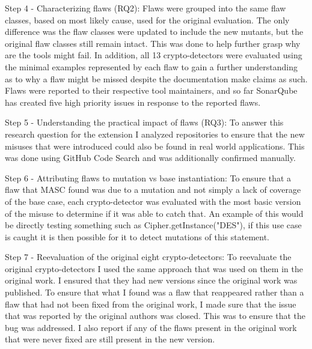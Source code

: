 Step 4 - Characterizing flaws (RQ2): Flaws were grouped into the same flaw classes, based on most likely cause, used for the original evaluation. The only difference was the flaw classes were updated to include the new mutants, but the original flaw classes still remain intact. This was done to help further grasp why are the tools might fail. In addition, all 13 crypto-detectors were evaluated using the minimal examples represented by each flaw to gain a further understanding as to why a flaw might be missed despite the documentation make claims as such. Flaws were reported to their respective tool maintainers, and so far SonarQube has created five high priority issues in response to the reported flaws.

Step 5 - Understanding the practical impact of flaws (RQ3): To answer this research question for the extension I analyzed repositories to ensure that the new misuses that were introduced could also be found in real world applications. This was done using GitHub Code Search and was additionally confirmed manually.

Step 6 - Attributing flaws to mutation vs base instantiation: To ensure that a flaw that MASC found was due to a mutation and not simply a lack of coverage of the base case, each crypto-detector was evaluated with the most basic version of the misuse to determine if it was able to catch that. An example of this would be directly testing something such as Cipher.getInstance("DES"), if this use case is caught it is then possible for it to detect mutations of this statement.

Step 7 - Reevaluation of the original eight crypto-detectors: To reevaluate the original crypto-detectors I used the same approach that was used on them in the original work. I ensured that they had new versions since the original work was published. To ensure that what I found was a flaw that reappeared rather than a flaw that had not been fixed from the original work, I made sure that the issue that was reported by the original authors was closed. This was to ensure that the bug was addressed. I also report if any of the flaws present in the original work that were never fixed are still present in the new version.